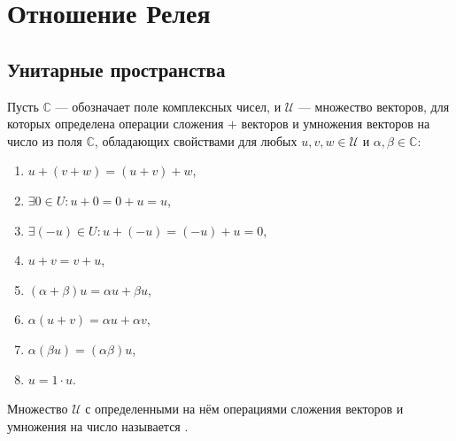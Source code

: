 \chapter{Отношение Релея}


\section{Унитарные пространства}

Пусть $\mathbb{C}$ --- обозначает поле комплексных чисел, и $\mathcal{U}$ --- множество векторов, для которых определена операции сложения $+$ векторов и умножения
векторов на число из поля $\mathbb{C}$, обладающих свойствами для любых $u, v, w \in \mathcal{U}$ и $\alpha, \beta \in \mathbb{C}$:
\begin{enumerate}
    \item $u + ( v + w ) = ( u + v ) + w$,
    \item $\exists 0 \in U: u + 0 = 0 + u = u$,
    \item $\exists (-u) \in U: u + (-u) = (-u) + u = 0$,
    \item $u + v = v + u$,
    \item $(\alpha + \beta) u = \alpha u + \beta u$,
    \item $\alpha ( u + v ) = \alpha u + \alpha v$,
    \item $\alpha (\beta u) = (\alpha \beta) u$,
    \item $u = 1 \cdot u$.
\end{enumerate}
Множество $\mathcal{U}$ с определенными на нём операциями сложения векторов и умножения на число называется .

